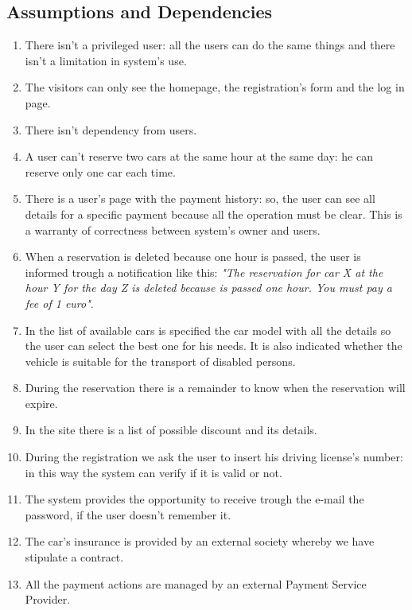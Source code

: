 \subsection{Assumptions and Dependencies} \label{subsec:dependencies}
\begin{enumerate}
\item There isn't a privileged user: all the users can do the same things and there isn't a limitation in system's use.
\item The visitors can only see the homepage, the registration's form and the log in page.
\item There isn't dependency from users.
\item A user can't reserve two cars at the same hour at the same day: he can reserve only one car each time.
\item There is a user's page with the payment history: so, the user can see all details for a specific payment because all the operation must be clear. This is a warranty of correctness between system's owner and users.
\item When a reservation is deleted because one hour is passed, the user is informed trough a notification like this: \emph{"The reservation for car X at the hour Y for the day Z is deleted because is passed one hour. You must pay a fee of 1 euro"}.
\item In the list of available cars is specified the car model with all the details so the user can select the best one for his needs. It is also indicated whether the vehicle is suitable for the transport of disabled persons.
\item During the reservation there is a remainder to know when the reservation will expire.
\item In the site there is a list of possible discount and its details.
\item During the registration we ask the user to insert his driving license's number: in this way the system can verify if it is valid or not.
\item The system provides the opportunity to receive trough the e-mail the password, if the user doesn't remember it.
\item The car's insurance is provided by an external society whereby we have stipulate a contract.
\item All the payment actions are managed by an external Payment Service Provider.
\end{enumerate}

